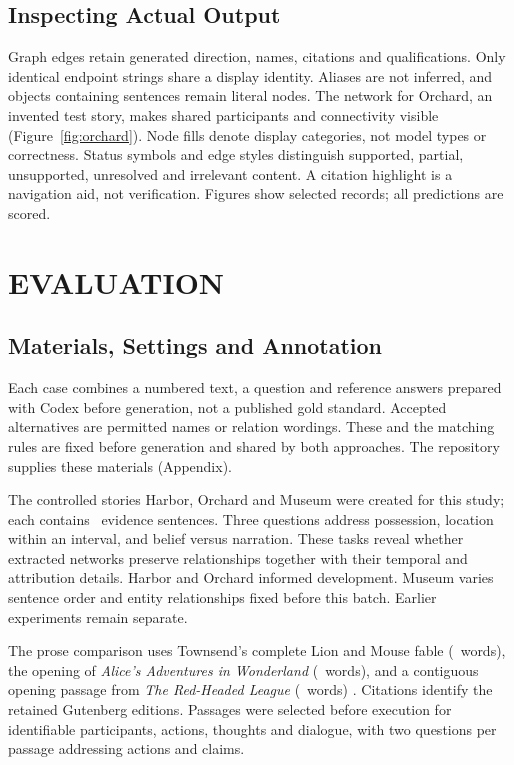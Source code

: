 \documentclass[a4paper,twoside]{article}
\begin{document}
\subsection{Inspecting Actual Output}
\noindent Graph edges retain generated direction, names, citations and qualifications. Only identical endpoint strings share a display identity. Aliases are not inferred, and objects containing sentences remain literal nodes. The network for Orchard, an invented test story, makes shared participants and connectivity visible (Figure~\ref{fig:orchard}). Node fills denote display categories, not model types or correctness. Status symbols and edge styles distinguish supported, partial, unsupported, unresolved and irrelevant content. A citation highlight is a navigation aid, not verification. Figures show selected records; all predictions are scored.
\FableFigure





\section{\uppercase{Evaluation}}




\subsection{Materials, Settings and Annotation}
\noindent Each case combines a numbered text, a question and reference answers prepared with Codex before generation, not a published gold standard. Accepted alternatives are permitted names or relation wordings. These and the matching rules are fixed before generation and shared by both approaches. The repository supplies these materials (Appendix).

The controlled stories Harbor, Orchard and Museum were created for this study; each contains \StorySentences\ evidence sentences. Three questions address possession, location within an interval, and belief versus narration. These tasks reveal whether extracted networks preserve relationships together with their temporal and attribution details. Harbor and Orchard informed development. Museum varies sentence order and entity relationships fixed before this batch. Earlier experiments remain separate.

The prose comparison uses Townsend's complete Lion and Mouse fable (\FableWords\ words), the opening of \emph{Alice's Adventures in Wonderland} (\AliceWords\ words), and a contiguous opening passage from \emph{The Red-Headed League} (\HolmesWords\ words) \cite{aesop,carroll,doyle}. Citations identify the retained Gutenberg editions. Passages were selected before execution for identifiable participants, actions, thoughts and dialogue, with two questions per passage addressing actions and claims.
\end{document}
